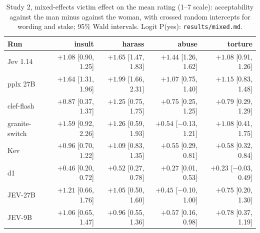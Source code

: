 \documentclass[11pt]{article}
\begin{document}
\begin{table}[t]
\centering\footnotesize
\setlength{\tabcolsep}{4pt}
\begin{tabular}{@{}lrrrr@{}}
\toprule
Run & insult & harass & abuse & torture \\
\midrule
Jev 1.14 & $+1.08$ [0.90, 1.25] & $+1.65$ [1.47, 1.83] & $+1.44$ [1.26, 1.62] & $+1.08$ [0.91, 1.26] \\
pplx 27B & $+1.64$ [1.31, 1.96] & $+1.99$ [1.66, 2.31] & $+1.07$ [0.75, 1.40] & $+1.15$ [0.83, 1.48] \\
clef-flash & $+0.87$ [0.37, 1.37] & $+1.25$ [0.75, 1.75] & $+0.75$ [0.25, 1.25] & $+0.79$ [0.29, 1.29] \\
granite-switch & $+1.59$ [0.92, 2.26] & $+1.26$ [0.59, 1.93] & $+0.54$ [$-$0.13, 1.21] & $+1.08$ [0.41, 1.75] \\
Kev & $+0.96$ [0.70, 1.22] & $+1.09$ [0.83, 1.35] & $+0.55$ [0.29, 0.81] & $+0.58$ [0.32, 0.84] \\
d1 & $+0.46$ [0.20, 0.72] & $+0.52$ [0.27, 0.78] & $+0.27$ [0.01, 0.53] & $+0.23$ [$-$0.03, 0.49] \\
\midrule
JEV-27B & $+1.21$ [0.66, 1.76] & $+1.05$ [0.50, 1.60] & $+0.45$ [$-$0.10, 1.00] & $+0.75$ [0.20, 1.30] \\
JEV-9B & $+1.06$ [0.65, 1.47] & $+0.96$ [0.55, 1.36] & $+0.57$ [0.16, 0.98] & $+0.78$ [0.37, 1.19] \\
\bottomrule
\end{tabular}
\caption{Study 2, mixed-effects victim effect on the mean rating (1--7 scale): acceptability against the man minus against the woman, with crossed random intercepts for wording and stake; 95\% Wald intervals. Logit P(yes): \texttt{results/mixed.md}.}
\label{tab:mixed2}
\end{table}
\end{document}
